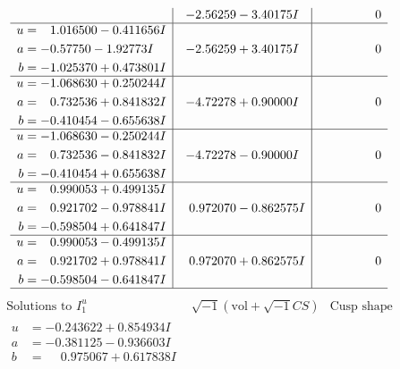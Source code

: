 \documentclass[1p]{elsarticle_modified}
\theoremstyle{definition}
\newcommand{\I}{\sqrt{-1}}
\begin{document}
$$\begin{array}{c|c|c}
 & -2.56259 - 3.40175 I & \phantom{-0.000000 } 0 \\ \hline\begin{aligned}
u &= \phantom{-}1.016500 - 0.411656 I \\
a &= -0.57750 - 1.92773 I \\
b &= -1.025370 + 0.473801 I\end{aligned}
 & -2.56259 + 3.40175 I & \phantom{-0.000000 } 0 \\ \hline\begin{aligned}
u &= -1.068630 + 0.250244 I \\
a &= \phantom{-}0.732536 + 0.841832 I \\
b &= -0.410454 - 0.655638 I\end{aligned}
 & -4.72278 + 0.90000 I & \phantom{-0.000000 } 0 \\ \hline\begin{aligned}
u &= -1.068630 - 0.250244 I \\
a &= \phantom{-}0.732536 - 0.841832 I \\
b &= -0.410454 + 0.655638 I\end{aligned}
 & -4.72278 - 0.90000 I & \phantom{-0.000000 } 0 \\ \hline\begin{aligned}
u &= \phantom{-}0.990053 + 0.499135 I \\
a &= \phantom{-}0.921702 - 0.978841 I \\
b &= -0.598504 + 0.641847 I\end{aligned}
 & \phantom{-}0.972070 - 0.862575 I & \phantom{-0.000000 } 0 \\ \hline\begin{aligned}
u &= \phantom{-}0.990053 - 0.499135 I \\
a &= \phantom{-}0.921702 + 0.978841 I \\
b &= -0.598504 - 0.641847 I\end{aligned}
 & \phantom{-}0.972070 + 0.862575 I & \phantom{-0.000000 } 0\\
 \hline 
 \end{array}$$\newpage$$\begin{array}{c|c|c}  
\text{Solutions to }I^u_{1}& \I (\text{vol} + \sqrt{-1}CS) & \text{Cusp shape}\\
 \hline 
\begin{aligned}
u &= -0.243622 + 0.854934 I \\
a &= -0.381125 - 0.936603 I \\
b &= \phantom{-}0.975067 + 0.617838 I\end{aligned}

\end{array}$$
\end{document}
